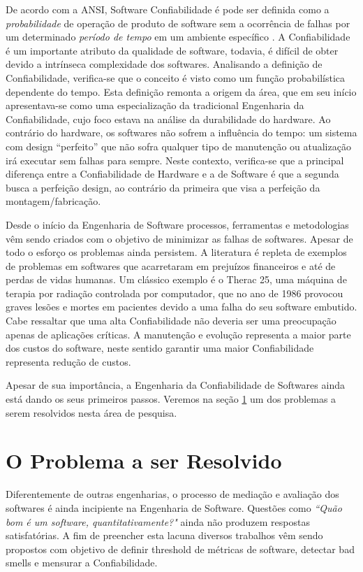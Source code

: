 \documentclass[12pt]{article}
\begin{document}
De acordo com a ANSI, Software Confiabilidade é pode ser definida como a \textit{probabilidade} de operação de produto de software sem a ocorrência de falhas por um determinado \textit{período de tempo} em um ambiente específico \cite{IEEE-610.12-1990,pham2007system}{}. A Confiabilidade é um importante atributo da qualidade de software, todavia, é difícil de obter devido a intrínseca complexidade dos softwares. Analisando a definição de Confiabilidade, verifica-se que o conceito é visto como um função probabilística dependente do tempo. Esta definição remonta a origem  da área, que em seu início apresentava-se como uma especialização da tradicional Engenharia da Confiabilidade, cujo foco  estava na análise da durabilidade do hardware. Ao contrário do hardware, os softwares não sofrem a influência do tempo: um sistema com design ``perfeito'' que não sofra qualquer tipo de manutenção ou atualização irá executar sem falhas para sempre. Neste contexto, verifica-se que a principal diferença entre a Confiabilidade de Hardware e a de Software é que a segunda busca a perfeição design, ao  contrário da primeira que visa a perfeição da montagem/fabricação.

Desde o início da Engenharia de Software processos, ferramentas e metodologias vêm sendo criados com o objetivo de minimizar as falhas de softwares. Apesar de todo o esforço os problemas ainda persistem. A literatura é repleta de exemplos de problemas em softwares que acarretaram em prejuízos financeiros e até de perdas de vidas humanas. Um clássico exemplo é o Therac 25, uma máquina de terapia por radiação controlada por computador, que no ano de 1986 provocou graves lesões e mortes em pacientes devido a uma falha do seu software embutido. Cabe ressaltar que uma alta Confiabilidade não deveria ser uma preocupação apenas de aplicações críticas. A manutenção e evolução representa a maior parte dos custos do software\cite{1423995}{}, neste sentido garantir uma maior Confiabilidade representa redução de custos.

Apesar de sua importância, a Engenharia da Confiabilidade de Softwares ainda está dando os seus primeiros passos. Veremos na seção \ref{sec:problema} um dos problemas a serem resolvidos nesta área de pesquisa.
\section{O Problema a ser Resolvido}
\label{sec:problema}

Diferentemente de outras engenharias, o processo de mediação e avaliação dos softwares é ainda incipiente na Engenharia de Software. Questões como \textit{``Quão bom é um software, quantitativamente?"} ainda não produzem respostas satisfatórias. A fim de preencher esta lacuna diversos trabalhos vêm sendo propostos com objetivo de definir threshold de métricas de software\cite{rttool,csmrwcre2014b,5609747}, detectar bad smells\cite{7012985}{} e mensurar a Confiabilidade\cite{Lyu:1996,srm:2000}{}.
\end{document}
